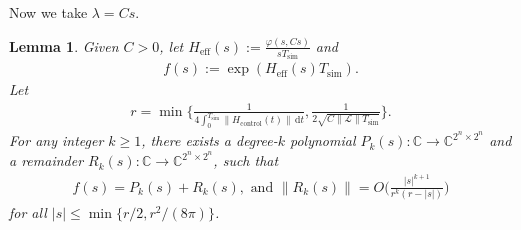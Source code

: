 \documentclass[11pt]{article}
\newtheorem{lemma}{Lemma}
\renewcommand{\d}{\mathrm{d}}
\renewcommand{\L}{\mathcal{L}}
\newcommand{\B}{\Big}
\newcommand{\simu}{\mathrm{sim}}
\newcommand{\Hc}{H_{\mathrm{control}}}
\newcommand{\He}{H_{\mathrm{eff}}}
\begin{document}
Now we take $\lambda = Cs$. 
\begin{lemma}
\label{lem:remainder-f}
    Given $C> 0$, let $\He(s) := \frac{\varphi(s, Cs)}{sT_{\simu}}$ and \begin{align*}
        f(s):= \exp(\He(s) T_{\simu}).
    \end{align*}
    Let \begin{align*}
        r=\min\Big\{ \frac{1}{4\int_{0}^{T_{\simu}}\|\Hc(t)\|\, \d t}, \frac{1}{2\sqrt{C\|\L\|T_{\simu}}}\Big\}.
    \end{align*}
    For any integer $k\ge 1$, there exists a degree-$k$ polynomial $P_k(s)\colon \mathbb{C}\to \mathbb{C}^{2^n\times 2^n}$ and a remainder $R_k(s)\colon \mathbb{C}\to \mathbb{C}^{2^n\times 2^n}$, such that \begin{align*}
        f(s) = P_k(s)+R_k(s), \text{ and }
        \|R_k(s)\|=O\B(\frac{|s|^{k+1}}{r^k(r-|s|)}\B)
    \end{align*}
    for all $|s|\le \min\{r/2,r^2/(8\pi)\}$. 
\end{lemma}
\end{document}
